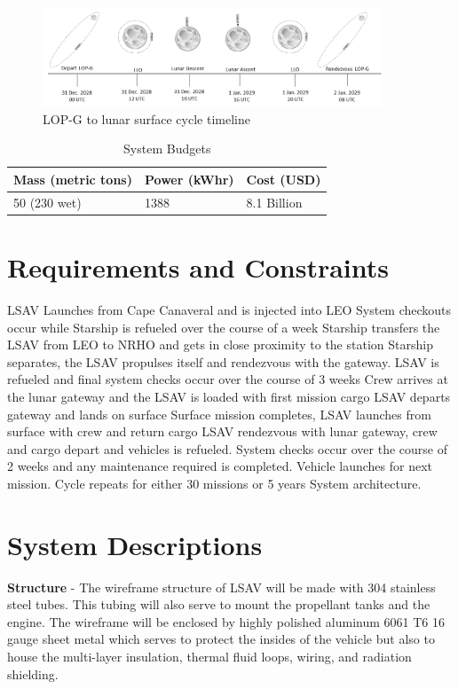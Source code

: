 \documentclass[10pt]{article}
\begin{document}
\begin{figure}[H]
  \centering
  \includegraphics[width=0.9\textwidth]{toon2}
  \caption{LOP-G to lunar surface cycle timeline}
  \label{fig:toon2}
\end{figure}

\begin{table}
  \centering
  \caption{System Budgets}
  \label{table:foo}
  \begin{tabular}{lll}
    Mass (metric tons) & Power (kWhr) & Cost (USD) \\ \hline
    50 (230 wet) & 1388 & 8.1 Billion \\
  \end{tabular}
\end{table}

\section{Requirements and Constraints}

LSAV Launches from Cape Canaveral and is injected into LEO System
checkouts occur while Starship is refueled over the course of a week
Starship transfers the LSAV from LEO to NRHO and gets in close
proximity to the station Starship separates, the LSAV propulses itself
and rendezvous with the gateway.  LSAV is refueled and final system
checks occur over the course of 3 weeks Crew arrives at the lunar
gateway and the LSAV is loaded with first mission cargo LSAV departs
gateway and lands on surface Surface mission completes, LSAV launches
from surface with crew and return cargo LSAV rendezvous with lunar
gateway, crew and cargo depart and vehicles is refueled.  System
checks occur over the course of 2 weeks and any maintenance required
is completed.  Vehicle launches for next mission.  Cycle repeats for
either 30 missions or 5 years System architecture.

\section{System Descriptions}

\textbf{Structure} - The wireframe structure of LSAV will be made with
304 stainless steel tubes.  This tubing will also serve to mount the
propellant tanks and the engine.  The wireframe will be enclosed by
highly polished aluminum 6061 T6 16 gauge sheet metal which serves to
protect the insides of the vehicle but also to house the multi-layer
insulation, thermal fluid loops, wiring, and radiation shielding.
\end{document}
